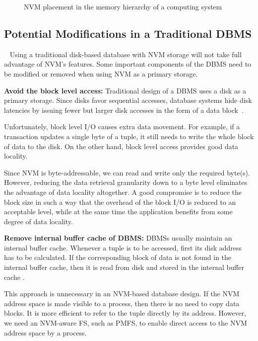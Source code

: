\begin{figure} %
\centering     %
{}
\caption{NVM placement in the memory hierarchy of a computing system}
\label{Fig2}
\end{figure}

\subsection{Potential Modifications in a Traditional DBMS}~\label{modList}
Using a traditional disk-based database with NVM storage will not take full advantage of NVM's features. Some important components of the DBMS need to be modified or removed when using NVM as a primary storage. 

\noindent\textbf{Avoid the block level access:} Traditional design of a DBMS uses a disk as a primary storage. Since disks favor sequential accesses, database systems hide disk latencies by issuing fewer but larger disk accesses in the form of a data block~\cite{schindler2002track}. 

Unfortunately, block level I/O causes extra data movement. For example, if a transaction updates a single byte of a tuple, it still needs to write the whole block of data to the disk. On the other hand, block level access provides good data locality.
 
Since NVM is byte-addressable, we can read and write only the required byte(s). However, reducing the data retrieval granularity down to a byte level eliminates the advantage of data locality altogether. A good compromise is to reduce the block size in such a way that the overhead of the block I/O is reduced to an acceptable level, while at the same time the application benefits from some degree of data locality. 
 
\noindent\textbf{Remove internal buffer cache of DBMS:} DBMSs usually maintain an internal buffer cache. Whenever a tuple is to be accessed, first its disk address has to be calculated. If the corresponding block of data is not found in the internal buffer cache, then it is read from disk and stored in the internal buffer cache \cite{debrabant2013anti}. 
 
This approach is unnecessary in an NVM-based database design. If the NVM address space is made visible to a process, then there is no need to copy data blocks. It is more efficient to refer to the tuple directly by its address. However, we need an NVM-aware FS, such as PMFS, to enable direct access to the NVM address space by a process.
 



